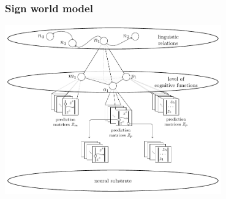 \documentclass[default]{beamer}
\begin{document}
	\begin{frame}
		\frametitle{Sign world model}
		\centering
		\includegraphics[width=0.7\textwidth]{signs/sign_levels_en}
		
		\nocite{*}
		\printbibliography[keyword={swm}, resetnumbers=true]
	\end{frame}				
		
\end{document}
